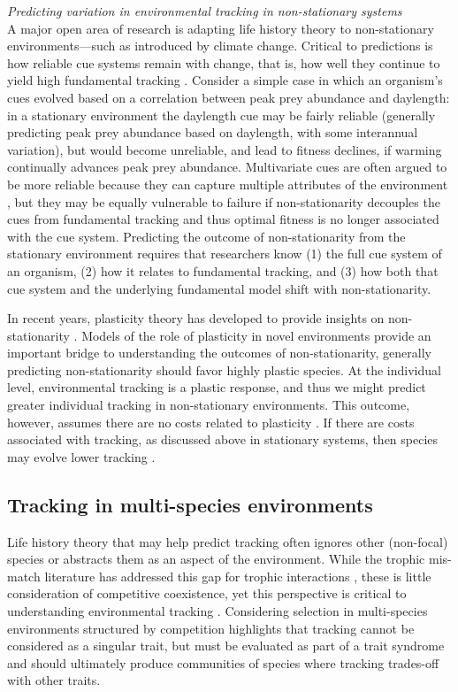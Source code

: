 \documentclass[11pt,letterpaper]{article}
\newcommand{\R}[1]{\label{#1}\linelabel{#1}}
\begin{document}
\emph{Predicting variation in environmental tracking in non-stationary systems}\\
A major open area of research is adapting life history theory to non-stationary environments---such as introduced by climate change. Critical to predictions is how reliable cue systems remain with change, that is, how well they continue to yield high fundamental tracking \citep{bonamour2019}. \R{r3birdsS}Consider a simple case in which an organism's cues evolved based on a correlation between peak prey abundance and daylength: in a stationary environment the daylength cue may be fairly reliable (generally predicting peak prey abundance based on daylength, with some interannual variation), but would become unreliable, and lead to fitness declines, if warming continually advances peak prey abundance. Multivariate cues are often argued to be more reliable because they can capture multiple attributes of the environment \citep{dore2018,bonamour2019}, but they may be equally vulnerable to failure if non-stationarity decouples the cues from fundamental tracking \citep{bonamour2019} and thus optimal fitness is no longer associated with the cue system. Predicting the outcome of non-stationarity from the stationary environment requires that researchers know (1) the full cue system of an organism, (2) how it relates to fundamental tracking, and (3) how both that cue system and the underlying fundamental model shift with non-stationarity.\R{r3birdsE}

In recent years, plasticity theory has developed to provide insights on non-stationarity \citep[or `sustained environmental change,' see][]{chevin2010}. Models of the role of plasticity in novel environments provide an important bridge to understanding the outcomes of non-stationarity, generally predicting non-stationarity should favor highly plastic species. At the individual level, environmental tracking is a plastic response, and thus we might predict greater individual tracking in non-stationary environments. This outcome, however, assumes there are no costs related to plasticity \citep{Ghalambor2007,tufto2015}. If there are costs associated with tracking, as discussed above in stationary systems, then species may evolve lower tracking \citep{auld2010}. 

\subsection{Tracking in multi-species environments} 
Life history theory that may help predict tracking often ignores other (non-focal) species or abstracts them as an aspect of the environment. While the trophic mis-match literature has addressed this gap for trophic interactions \citep{Visser:2005bg,vissergienapp2019}, these is little consideration of competitive coexistence, yet this perspective is critical to understanding environmental tracking \citep{metcalf2015}. Considering selection in multi-species environments structured by competition highlights that tracking cannot be considered as a singular trait, but must be evaluated as part of a trait syndrome \citep[or mosaic of traits,][]{Ghalambor2007} and should ultimately produce communities of species where tracking trades-off with other traits. 
\end{document}
